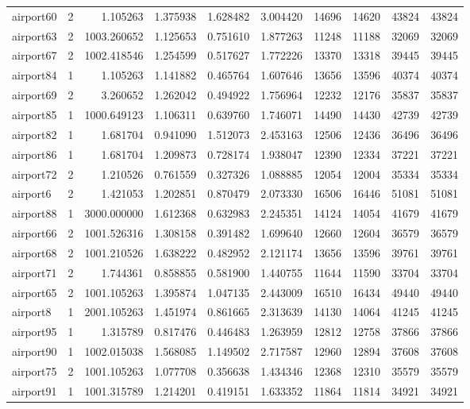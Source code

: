 \begin{longtable}{|l|r|r|r|r|r|r|r|r|r|}
airport60 & 2 & 1.105263 & 1.375938 & 1.628482 & 3.004420 & 14696 & 14620 & 43824 & 43824 \\
airport63 & 2 & 1003.260652 & 1.125653 & 0.751610 & 1.877263 & 11248 & 11188 & 32069 & 32069 \\
airport67 & 2 & 1002.418546 & 1.254599 & 0.517627 & 1.772226 & 13370 & 13318 & 39445 & 39445 \\
airport84 & 1 & 1.105263 & 1.141882 & 0.465764 & 1.607646 & 13656 & 13596 & 40374 & 40374 \\
airport69 & 2 & 3.260652 & 1.262042 & 0.494922 & 1.756964 & 12232 & 12176 & 35837 & 35837 \\
airport85 & 1 & 1000.649123 & 1.106311 & 0.639760 & 1.746071 & 14490 & 14430 & 42739 & 42739 \\
airport82 & 1 & 1.681704 & 0.941090 & 1.512073 & 2.453163 & 12506 & 12436 & 36496 & 36496 \\
airport86 & 1 & 1.681704 & 1.209873 & 0.728174 & 1.938047 & 12390 & 12334 & 37221 & 37221 \\
airport72 & 2 & 1.210526 & 0.761559 & 0.327326 & 1.088885 & 12054 & 12004 & 35334 & 35334 \\
airport6 & 2 & 1.421053 & 1.202851 & 0.870479 & 2.073330 & 16506 & 16446 & 51081 & 51081 \\
airport88 & 1 & 3000.000000 & 1.612368 & 0.632983 & 2.245351 & 14124 & 14054 & 41679 & 41679 \\
airport66 & 2 & 1001.526316 & 1.308158 & 0.391482 & 1.699640 & 12660 & 12604 & 36579 & 36579 \\
airport68 & 2 & 1001.210526 & 1.638222 & 0.482952 & 2.121174 & 13656 & 13596 & 39761 & 39761 \\
airport71 & 2 & 1.744361 & 0.858855 & 0.581900 & 1.440755 & 11644 & 11590 & 33704 & 33704 \\
airport65 & 2 & 1001.105263 & 1.395874 & 1.047135 & 2.443009 & 16510 & 16434 & 49440 & 49440 \\
airport8 & 1 & 2001.105263 & 1.451974 & 0.861665 & 2.313639 & 14130 & 14064 & 41245 & 41245 \\
airport95 & 1 & 1.315789 & 0.817476 & 0.446483 & 1.263959 & 12812 & 12758 & 37866 & 37866 \\
airport90 & 1 & 1002.015038 & 1.568085 & 1.149502 & 2.717587 & 12960 & 12894 & 37608 & 37608 \\
airport75 & 2 & 1001.105263 & 1.077708 & 0.356638 & 1.434346 & 12368 & 12310 & 35579 & 35579 \\
airport91 & 1 & 1001.315789 & 1.214201 & 0.419151 & 1.633352 & 11864 & 11814 & 34921 & 34921 \\

\end{longtable}
